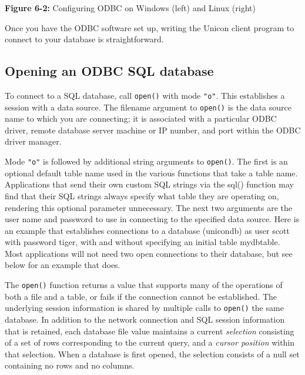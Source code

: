 {\sffamily\bfseries Figure 6-2:}
{\sffamily Configuring ODBC on Windows (left) and Linux (right)}

\bigskip


Once you have the ODBC software set up,
writing the Unicon client program to connect to your database is
straightforward.

\subsection*{Opening an ODBC SQL database}

To connect to a SQL database, call \texttt{open()} with mode
\texttt{"o"}. This establishes a session with a data source. The
filename argument to \texttt{open()} is the data source name to which
you are connecting; it is associated with a particular ODBC driver,
remote database server machine or IP number, and port within the ODBC
driver manager.

Mode \texttt{"o"} is followed by additional string arguments to
\texttt{open()}. The first is an optional default table name used in
the various functions that take a table name.  Applications that send
their own custom SQL strings via the sql() function may find that
their SQL strings always specify what table they are operating on,
rendering this optional parameter unnecessary.  The next two arguments
are the user name and password to use in connecting to the specified
data source. Here is an example that establishes connections to a
database (unicondb) as user scott with password tiger, with and
without specifying an initial table mydbtable.  Most applications
will not need two open connections to their database, but see below
for an example that does.


The \texttt{open()} function returns a value that supports many of the
operations of both a file and a table, or fails if the connection
cannot be established. The underlying session information is shared by
multiple calls to \texttt{open()} the same database. In addition to
the network connection and SQL session information that is retained,
each database file value maintains a current \textit{selection}
consisting of a set of rows corresponding to the current query, and a
\textit{cursor position} within that selection. When a database is
first opened, the selection consists of a null set containing no rows
and no columns.

